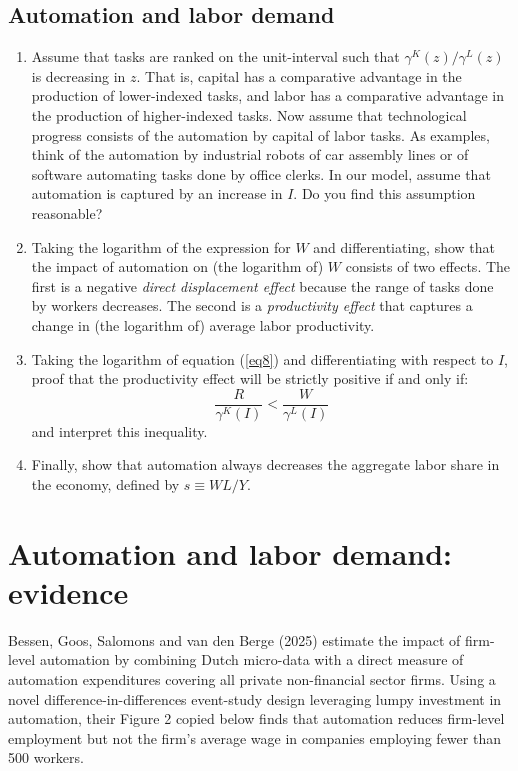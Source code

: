 \documentclass[a4paper,12pt]{article}
\begin{document}
\subsection{Automation and labor demand}

\begin{enumerate}

\item[(2.6)] Assume that tasks are ranked on the unit-interval such that $\gamma^{K}(z)/ \gamma^{L}(z)$ is decreasing in $z$. That is, capital has a comparative advantage in the production of lower-indexed tasks, and labor has a comparative advantage in the production of higher-indexed tasks. Now assume that technological progress consists of the automation by capital of labor tasks. As examples, think of the automation by industrial robots of car assembly lines or of software automating tasks done by office clerks. In our model, assume that automation is captured by an increase in $I$. Do you find this assumption reasonable?

\item[(2.7)] Taking the logarithm of the expression for $W$ and differentiating, show that the impact of automation on (the logarithm of) $W$ consists of two effects. The first is a negative \textit{direct displacement effect} because the range of tasks done by workers decreases. The second is a \textit{productivity effect} that captures a change in (the logarithm of) average labor productivity.

\item[(2.8)] Taking the logarithm of equation (\ref{eq8}) and differentiating with respect to $I$, proof that the productivity effect will be strictly positive if and only if:
\[
\frac{R}{\gamma^{K}(I)} < \frac{W}{\gamma^{L}(I)}
\]
and interpret this inequality.

\item[(2.9)] Finally, show that automation always decreases the aggregate labor share in the economy, defined by $s \equiv WL/Y$.

\end{enumerate}

\newpage

\section{Automation and labor demand: evidence}

Bessen, Goos, Salomons and van den Berge (2025) estimate the impact of firm-level automation by combining Dutch micro-data with a direct measure of automation expenditures covering all private non-financial sector firms. Using a novel difference-in-differences event-study design leveraging lumpy investment in automation, their Figure 2 copied below finds that automation reduces firm-level employment but not the firm's average wage in companies employing fewer than 500 workers. 
\end{document}
